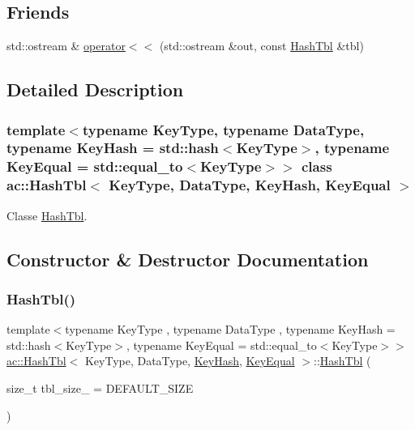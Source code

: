 \subsection*{Friends}
\begin{DoxyCompactItemize}
\item 
std\+::ostream \& \hyperlink{classac_1_1_hash_tbl_aa4216a6adbf7410e7e4a66d964e223ea}{operator$<$$<$} (std\+::ostream \&out, const \hyperlink{classac_1_1_hash_tbl}{Hash\+Tbl} \&tbl)
\end{DoxyCompactItemize}


\subsection{Detailed Description}
\subsubsection*{template$<$typename Key\+Type, typename Data\+Type, typename Key\+Hash = std\+::hash$<$\+Key\+Type$>$, typename Key\+Equal = std\+::equal\+\_\+to$<$\+Key\+Type$>$$>$\newline
class ac\+::\+Hash\+Tbl$<$ Key\+Type, Data\+Type, Key\+Hash, Key\+Equal $>$}

Classe \hyperlink{classac_1_1_hash_tbl}{Hash\+Tbl}. 

\subsection{Constructor \& Destructor Documentation}
\mbox{\label{classac_1_1_hash_tbl_ac02d4c4a0982bb5f8cc74719ed378b80}} 
\subsubsection{\texorpdfstring{Hash\+Tbl()}{HashTbl()}\hspace{0.1cm}{\footnotesize\ttfamily [1/3]}}
{\footnotesize\ttfamily template$<$typename Key\+Type , typename Data\+Type , typename Key\+Hash  = std\+::hash$<$\+Key\+Type$>$, typename Key\+Equal  = std\+::equal\+\_\+to$<$\+Key\+Type$>$$>$ \\
\hyperlink{classac_1_1_hash_tbl}{ac\+::\+Hash\+Tbl}$<$ Key\+Type, Data\+Type, \hyperlink{struct_key_hash}{Key\+Hash}, \hyperlink{struct_key_equal}{Key\+Equal} $>$\+::\hyperlink{classac_1_1_hash_tbl}{Hash\+Tbl} (\begin{DoxyParamCaption}\item[{size\+\_\+t}]{tbl\+\_\+size\+\_\+ = {\ttfamily DEFAULT\+\_\+SIZE} }\end{DoxyParamCaption})\hspace{0.3cm}{\ttfamily [inline]}}

